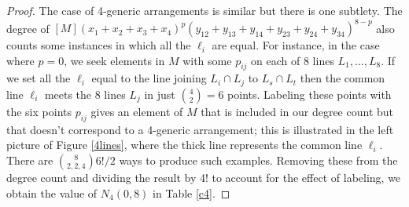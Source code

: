 \documentclass[12pt]{article}
\theoremstyle{plain}
\theoremstyle{definition}
\begin{document}
\begin{proof}

The case of 4-generic arrangements is similar but there is one
subtlety. The degree of $[M](x_1+x_2+x_3+x_4)^p(y_{12}+y_{13}+y_{14}+y_{23}+y_{24}+y_{34})^{8-p}$
also counts some instances in which all the $\ell_i$ are equal. For
instance, in the case where $p=0$, we seek elements in $M$ with some
$p_{ij}$ on each of $8$ lines $L_1, \ldots, L_8$. If we set all the
$\ell_i$ equal to the line joining $L_i\cap L_j$ to $L_s \cap L_t$
then the common line $\ell_i$ meets the 8 lines $L_j$ in just
$\binom{4}{2}=6$ points. Labeling these points with the six points
$p_{ij}$ gives an element of $M$ that is included in our degree count
but that doesn't correspond to a 4-generic arrangement; this is
illustrated in the left picture of Figure \ref{4lines}, where the
thick line represents the common line $\ell_i$.  There are
$\binom{8}{2,2,4}6!/2$ ways to produce such examples. Removing these
from the degree count and dividing the result by 4! to account for the
effect of labeling, we obtain the value of $N_4(0,8)$ in Table
\ref{c4}. 


\end{proof}
\end{document}
